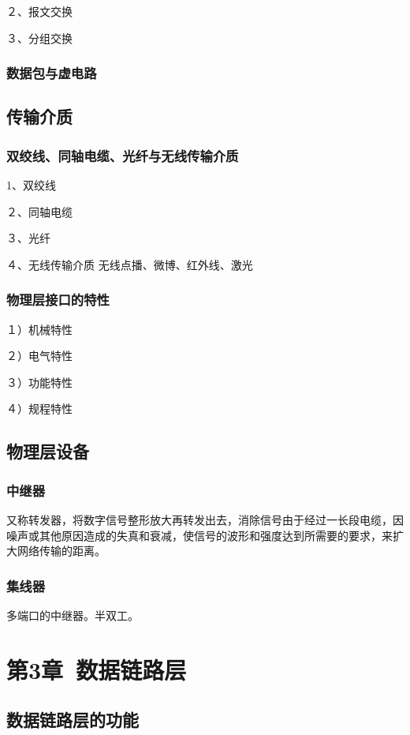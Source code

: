 \documentclass{ctexart}
\begin{document}
２、报文交换

３、分组交换

\subsubsection{数据包与虚电路}

\subsection{传输介质}

\subsubsection{双绞线、同轴电缆、光纤与无线传输介质}
1、双绞线

２、同轴电缆

３、光纤

４、无线传输介质
无线点播、微博、红外线、激光

\subsubsection{物理层接口的特性}
１）机械特性

２）电气特性

３）功能特性

４）规程特性

\subsection{物理层设备}

\subsubsection{中继器}
又称转发器，将数字信号整形放大再转发出去，消除信号由于经过一长段电缆，因噪声或其他原因造成的失真和衰减，使信号的波形和强度达到所需要的要求，来扩大网络传输的距离。

\subsubsection{集线器}
多端口的中继器。半双工。

\section{第3章\ 数据链路层}

\subsection{数据链路层的功能}
\end{document}
